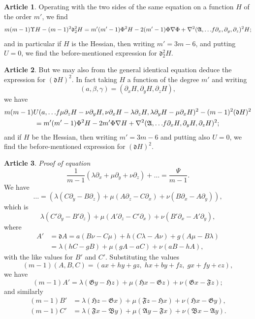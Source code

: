 \documentclass[12pt,a4paper]{article}
\theoremstyle{definition}
\newtheorem{art}{Article}[section]
\begin{document}
\begin{art}
Operating with the two sides of the same equation on a function $H$ of the order $m'$, we find
\[
m(m - 1)\Upsilon H - (m - 1)^2\mathfrak{d}_2^2 H = m'(m' - 1)\Phi^2 H - 2(m' - 1)\Phi\nabla\Phi + \nabla^2(\mathfrak{A}, \ldots \hspace{-2pt} f\partial_x, \partial_y, \partial_z)^2 H;
\]
and in particular if $H$ is the Hessian, then writing $m' = 3m - 6$, and putting $U = 0$, we find the before-mentioned expression for $\mathfrak{d}_2^2 H$.
\end{art}

\begin{art}
But we may also from the general identical equation deduce the expression for $(\mathfrak{d}H)^2$. In fact taking $H$ a function of the degree $m'$ and writing
\[
(a, \beta, \gamma) = (\partial_x H, \partial_y H, \partial_z H),
\]
we have
\begin{multline*}
m(m - 1)U(a, \ldots \hspace{-2pt} f\mu\partial_z H - \nu\partial_y H, \nu\partial_x H - \lambda\partial_z H, \lambda\partial_y H - \mu\partial_x H)^2 - (m - 1)^2(\mathfrak{d}H)^2 \\
= m'(m' - 1)\Phi^2 H - 2m'\Phi\nabla H + \nabla^2(\mathfrak{A}, \ldots \hspace{-2pt} f\partial_x H, \partial_y H, \partial_z H)^2;
\end{multline*}
and if $H$ be the Hessian, then writing $m' = 3m - 6$ and putting also $U = 0$, we find the before-mentioned expression for $(\mathfrak{d}H)^2$.
\end{art}

\begin{art}
\textit{Proof of equation}
\[
\frac{1}{m - 1}(\lambda\partial_x + \mu\partial_y + \nu\partial_z) + \ldots = \frac{\Psi}{m - 1}.
\]
We have
\[
\ldots = (\lambda(C\partial_y - B\partial_z) + \mu(A\partial_z - C\partial_x) + \nu(B\partial_x - A\partial_y)),
\]
which is
\[
\lambda(C'\partial_y - B'\partial_z) + \mu(A'\partial_z - C'\partial_x) + \nu(B'\partial_x - A'\partial_y),
\]
where
\begin{align*}
A' &= \mathfrak{d}A = a(B\nu - C\mu) + h(C\lambda - A\nu) + g(A\mu - B\lambda) \\
&= \lambda(hC - gB) + \mu(gA - aC) + \nu(aB - hA),
\end{align*}
with the like values for $B'$ and $C'$. Substituting the values
\[
(m - 1)(A, B, C) = (ax + hy + gz, \; hx + by + fz, \; gx + fy + cz),
\]
we have
\[
(m - 1)A' = \lambda(\mathfrak{G}y - \mathfrak{H}z) + \mu(\mathfrak{H}x - \mathfrak{G}z) + \nu(\mathfrak{G}x - \mathfrak{F}z);
\]
and similarly
\begin{align*}
(m - 1)B' &= \lambda(\mathfrak{H}z - \mathfrak{G}x) + \mu(\mathfrak{F}z - \mathfrak{H}x) + \nu(\mathfrak{H}x - \mathfrak{G}y), \\
(m - 1)C' &= \lambda(\mathfrak{F}x - \mathfrak{B}y) + \mu(\mathfrak{A}y - \mathfrak{F}x) + \nu(\mathfrak{B}x - \mathfrak{A}y).
\end{align*}
\end{art}
\end{document}
